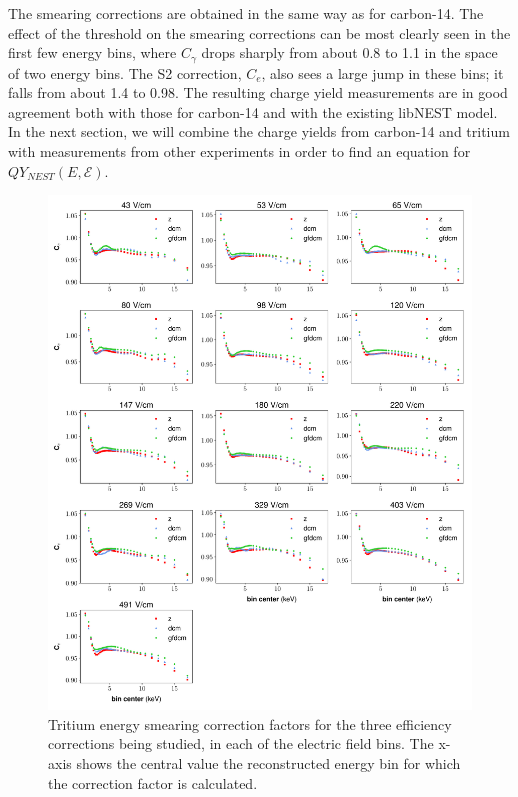 The smearing corrections are obtained in the same way as for carbon-14. The effect of the threshold on the smearing corrections can be most clearly seen in the first few energy bins, where $C_{\gamma}$ drops sharply from about 0.8 to 1.1 in the space of two energy bins. The S2 correction, $C_{e}$, also sees a large jump in these bins; it falls from about 1.4 to 0.98. The resulting charge yield measurements are in good agreement both with those for carbon-14 and with the existing libNEST model. In the next section, we will combine the charge yields from carbon-14 and tritium with measurements from other experiments in order to find an equation for $QY_{NEST}(E,\mathcal{E})$.

\begin{figure}[h!]
\centering
\includegraphics[width=\textwidth]{Figures/H3_CE_prelim.pdf}
\caption{Tritium energy smearing correction factors for the three efficiency corrections being studied, in each of the electric field bins. The x-axis shows the central value the reconstructed energy bin for which the correction factor is calculated.}
\label{fig:H3_CE_prelim}
\end{figure}
